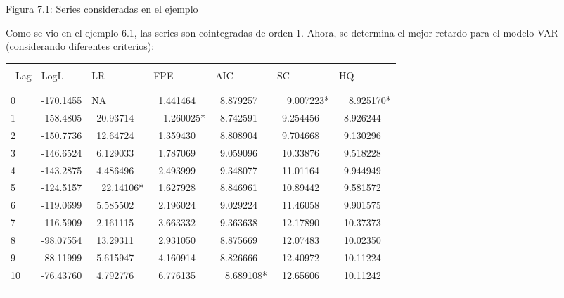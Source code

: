 \begin{center}
Figura 7.1: Series consideradas en el ejemplo
\end{center}

Como se vio en el ejemplo 6.1, las series son cointegradas de orden 1. 
Ahora, se determina el mejor retardo para el modelo VAR (considerando 
diferentes criterios):

\begin{table}[H]
\begin{center}
\begin{tabular}{|p{43pt}|l|l|l|l|l|l|}
\hline
& 
& 
& 
& 
& 
& 
 \\
\hline
& 
& 
& 
& 
& 
& 
 \\
\hline
~Lag& 
LogL& 
LR& 
FPE& 
AIC& 
SC& 
HQ \\
\hline
& 
& 
& 
& 
& 
& 
 \\
\hline
& 
& 
& 
& 
& 
& 
 \\
\hline
0& 
-170.1455& 
NA~& 
~1.441464& 
~8.879257& 
~~9.007223*& 
~~8.925170* \\
\hline
1& 
-158.4805& 
~20.93714& 
~~1.260025*& 
~8.742591& 
~9.254456& 
~8.926244 \\
\hline
2& 
-150.7736& 
~12.64724& 
~1.359430& 
~8.808904& 
~9.704668& 
~9.130296 \\
\hline
3& 
-146.6524& 
~6.129033& 
~1.787069& 
~9.059096& 
~10.33876& 
~9.518228 \\
\hline
4& 
-143.2875& 
~4.486496& 
~2.493999& 
~9.348077& 
~11.01164& 
~9.944949 \\
\hline
5& 
-124.5157& 
~~22.14106*& 
~1.627928& 
~8.846961& 
~10.89442& 
~9.581572 \\
\hline
6& 
-119.0699& 
~5.585502& 
~2.196024& 
~9.029224& 
~11.46058& 
~9.901575 \\
\hline
7& 
-116.5909& 
~2.161115& 
~3.663332& 
~9.363638& 
~12.17890& 
~10.37373 \\
\hline
8& 
-98.07554& 
~13.29311& 
~2.931050& 
~8.875669& 
~12.07483& 
~10.02350 \\
\hline
9& 
-88.11999& 
~5.615947& 
~4.160914& 
~8.826666& 
~12.40972& 
~10.11224 \\
\hline
10& 
-76.43760& 
~4.792776& 
~6.776135& 
~~8.689108*& 
~12.65606& 
~10.11242 \\
\hline
& 
& 
& 
& 
& 
& 
 \\
\hline
& 
& 
& 
& 
& 
& 
 \\
\hline
\end{tabular}
\label{tab7}
\end{center}
\end{table}


